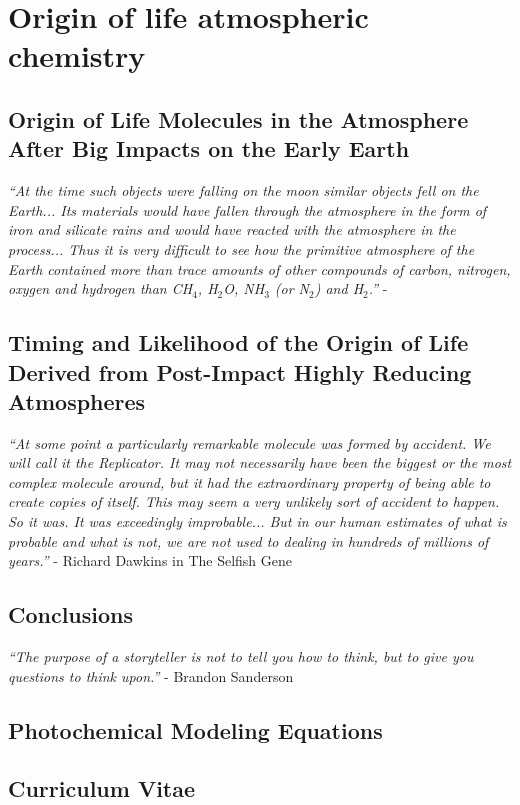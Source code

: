 \documentclass[11pt, proquest]{uwthesis}[2016/11/22]
\begin{document}
\newpage


\part{Origin of life atmospheric chemistry} \label{pt:2}

\chapter{Origin of Life Molecules in the Atmosphere After Big Impacts on the Early Earth} \label{ch:5}
\noindent \emph{``At the time such objects were falling on the moon similar objects fell on the Earth... Its materials would have fallen through the atmosphere in the form of iron and silicate rains and would have reacted with the atmosphere in the process... Thus it is very difficult to see how the primitive atmosphere of the Earth contained more than trace amounts of other compounds of carbon, nitrogen, oxygen and hydrogen than CH$_4$, H$_2$O, NH$_3$ (or N$_2$) and H$_2$.''} - \citet{Urey_1952}
\newpage


\chapter{Timing and Likelihood of the Origin of Life Derived from Post-Impact Highly Reducing Atmospheres} \label{ch:6}
\noindent \emph{``At some point a particularly remarkable molecule was formed by accident. We will call it the Replicator. It may not necessarily have been the biggest or the most complex molecule around, but it had the extraordinary property of being able to create copies of itself. This may seem a very unlikely sort of accident to happen. So it was. It was exceedingly improbable... But in our human estimates of what is probable and what is not, we are not used to dealing in hundreds of millions of years.''} - Richard Dawkins in The Selfish Gene
\newpage


\chapter{Conclusions}
\noindent \emph{``The purpose of a storyteller is not to tell you how to think, but to give you questions to think upon.''} - Brandon Sanderson
\newpage


\printendnotes

%
%


%
%
\appendix
\raggedbottom\sloppy
 
 
\chapter{Photochemical Modeling Equations}
\newpage


\chapter{Curriculum Vitae}
\newpage

 
\end{document}
